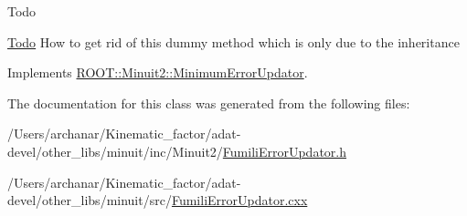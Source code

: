 \begin{DoxyRefDesc}{Todo}
\item[\mbox{\hyperlink{todo__todo000031}{Todo}}]How to get rid of this dummy method which is only due to the inheritance\end{DoxyRefDesc}


Implements \mbox{\hyperlink{classROOT_1_1Minuit2_1_1MinimumErrorUpdator_ae75c33152c49ebf34e6119adc0bbbda9}{R\+O\+O\+T\+::\+Minuit2\+::\+Minimum\+Error\+Updator}}.



The documentation for this class was generated from the following files\+:\begin{DoxyCompactItemize}
\item 
/\+Users/archanar/\+Kinematic\+\_\+factor/adat-\/devel/other\+\_\+libs/minuit/inc/\+Minuit2/\mbox{\hyperlink{adat-devel_2other__libs_2minuit_2inc_2Minuit2_2FumiliErrorUpdator_8h}{Fumili\+Error\+Updator.\+h}}\item 
/\+Users/archanar/\+Kinematic\+\_\+factor/adat-\/devel/other\+\_\+libs/minuit/src/\mbox{\hyperlink{adat-devel_2other__libs_2minuit_2src_2FumiliErrorUpdator_8cxx}{Fumili\+Error\+Updator.\+cxx}}\end{DoxyCompactItemize}
